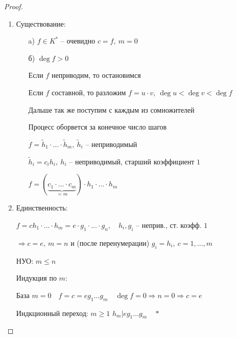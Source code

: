     \begin{proof}
        $ $
        \begin{enumerate}
            \item Существование:
            \begin{enumerate}
                \item[a)] $f \in K^*$ -- очевидно \quad $c = f, \ m = 0$
                \item[б)] $\deg f > 0$
                \par \quad Если $f$ неприводим, то остановимся
                \par \quad Если $f$ составной, то разложим $f = u \cdot v, \ \deg u < \deg v < \deg f$
                \par \quad Дальше так же поступим с каждым из сомножителей
                \par \quad Процесс оборвется за конечное число шагов
                \par \quad $f = \tilde h_1 \cdot \ldots \cdot \tilde h_m, \ \tilde h_i$ -- неприводимый
                \par \quad $\tilde h_i = c_i h_i, \ h_i$ -- неприводимый, старший коэффициент $1$
                \par \quad $f = (\underbrace{c_1 \cdot \ldots \cdot c_m}_{=m}) \cdot h_1 \cdot \ldots \cdot h_m$
            \end{enumerate}
            \item Единственность:
            \par \quad $f = c h_1 \cdot \ldots \cdot h_m = e \cdot g_1 \cdot \ldots \cdot g_n, \quad h_i, g_i$ -- неприв., ст. коэфф. $1$
            \par \quad $\Rightarrow c = e, \ m = n$ и (после перенумерации) $g_i = h_i, \ c = 1, \dots, m$
            \par \quad НУО: \quad $m \le n$
            \par Индукция по $m$:
            \par \quad База $m = 0 \quad f = c = eg_1 \dots g_m \quad \deg f = 0 \Rightarrow n = 0 \Rightarrow c = e$
            \par \quad Индкционный переход: $m \ge 1$ \quad $h_m | eg_1 \dots g_m \quad \boxed{*}$
        \end{enumerate}
    \end{proof}


